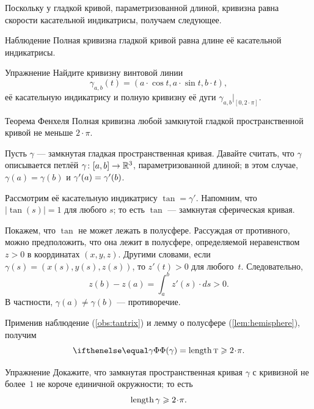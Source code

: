 Поскольку у гладкой кривой, параметризованной длиной, кривизна равна скорости касательной индикатрисы,
получаем следующее.

\begin{thm}{Наблюдение}\label{obs:tantrix}
Полная кривизна гладкой кривой равна длине её касательной индикатрисы.
\end{thm}

\begin{thm}{Упражнение}\label{ex:helix-curvature}
Найдите кривизну винтовой линии 
\[\gamma_{a,b}(t)=(a\cdot \cos t,a\cdot \sin t,b\cdot t),\]
её касательную индикатрису и полную кривизну её дуги $\gamma_{a,b}|_{[0,2\cdot\pi]}$.
\end{thm}

{\sloppy

\begin{thm}{Теорема Фенхеля}
\label{thm:fenchel}
Полная кривизна любой замкнутой гладкой пространственной кривой не меньше $2\cdot\pi$.
\end{thm}

}

Пусть $\gamma$ --- замкнутая гладкая пространственная кривая.
Давайте считать, что $\gamma$ описывается петлёй $\gamma\:[a,b]\z\to \mathbb{R}^3$, параметризованной длиной;
в этом случае, $\gamma(a)=\gamma(b)$ и $\gamma'(a)\z=\gamma'(b)$.

Рассмотрим её касательную индикатрису $\tan=\gamma'$.
Напомним, что $|\tan(s)|=1$ для любого $s$; то есть $\tan$ --- замкнутая сферическая кривая.

Покажем, что $\tan$ не может лежать в полусфере.
Рассуждая от противного, можно предположить, что она лежит в полусфере, определяемой неравенством $z>0$ в координатах $(x,y,z)$.
Другими словами, если $\gamma(s)=(x(s), y(s), z(s))$, то $z'(t)>0$ для любого~$t$.
Следовательно,
\[z(b)-z(a)=\int_a^b z'(s)\cdot ds>0.\]
В частности, $\gamma(a)\ne \gamma(b)$ --- противоречие.

Применив наблюдение (\ref{obs:tantrix}) и лемму о полусфере (\ref{lem:hemisphere}), получим  
\[\tc\gamma=\length \tan\ge2\cdot\pi.\]
\qedsf


\begin{thm}{Упражнение}\label{ex:length>=2pi}
Докажите, что замкнутая пространственная кривая $\gamma$ с кривизной не более~$1$ не короче единичной окружности;
то есть
\[\length\gamma\ge 2\cdot \pi.\]

\end{thm}

